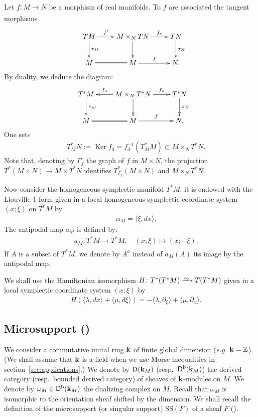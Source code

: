 \documentclass[12pt,leqno]{article}
\theoremstyle{definition}
\newcommand{\Z}{{\mathbb{Z}}}
\newcommand{\cor}{{\bf k}}
\renewcommand{\ker}{\operatorname{Ker}}
\renewcommand{\to}[1][]{\xrightarrow[]{#1}}
\newcommand{\isoto}[1][]{\xrightarrow[#1]%
{{\raisebox{-.6ex}[0ex][-.6ex]{$\mspace{1mu}\sim\mspace{2mu}$}}}}
\newcommand{\opb}[1]{#1^{-1}}
\newcommand{\eqdot}{\mathbin{:=}}
\newcommand{\cl}{\colon}
\newcommand{\ba}{\begin{array}}
\newcommand{\ea}{\end{array}}
\newcommand{\eq}{\begin{eqnarray}}
\newcommand{\eneq}{\end{eqnarray}}
\newcommand{\eqn}{\begin{eqnarray*}}
\newcommand{\eneqn}{\end{eqnarray*}}
\newcommand{\Der}[1][]{\mathsf{D}^{#1}}
\newcommand{\Derb}{\Der[\mathrm{b}]}
\newcommand{\SSi}{\mathrm{SS}}
\numberwithin{equation}{section}
\begin{document}
Let $f\cl M\to N$ be  a morphism of  real manifolds. 
To $f$ are associated the tangent morphisms
\eq\label{diag:tgmor}
&&
\ba{c}
\xymatrix{
TM\ar[d]^-{\tau_M}\ar[r]^-{f'}&M\times_NTN\ar[d]\ar[r]^-{f_\tau}&TN\ar[d]^-{\tau_N}\\
M\ar@{=}[r]&M\ar[r]^-f&N.
}\ea\eneq
By duality, we deduce the diagram: 
\eq\label{diag:cotgmor}
&&\ba{c}\xymatrix{
T^*M\ar[d]^-{\pi_M}&M\times_NT^*N\ar[d]\ar[l]_-{f_d}\ar[r]^-{f_\pi}
                                       & T^*N\ar[d]^-{\pi_N}\\
M\ar@{=}[r]&M\ar[r]^-f&N.
}\ea\eneq
One sets 
\eqn
&&T^*_MN\eqdot\ker f_d= \opb{f_d}(T^*_MM)\subset M\times_NT^*N  . 
\eneqn
Note that, denoting by $\Gamma_f$ the graph of $f$ in $M\times N$, 
the projection $T^*(M\times N)\to M\times T^*N$ identifies 
$T^*_{\Gamma_f}(M\times N)$ and $M\times_NT^*N$.




Now consider the homogeneous symplectic manifold $T^*M$: it is endowed
with the Liouville $1$-form given in a local homogeneous symplectic 
coordinate system $(x;\xi)$ on $T^*M$ by
\eqn
&&\alpha_M=\langle\xi,dx\rangle.
\eneqn
The antipodal map $a_M$ is defined by:
\eq\label{eq:antipodal}
&&a_M\cl T^*M\to T^*M,\quad(x;\xi)\mapsto(x;-\xi).
\eneq
If $A$ is a subset of $T^*M$, we denote by $A^a$ instead of $a_M(A)$ 
its image by the antipodal map.

We shall use the Hamiltonian isomorphism 
$H\cl T^*(T^*M)\isoto T(T^*M)$ given in a local symplectic coordinate system 
$(x;\xi)$ by
\eqn
&&H(\langle\lambda,dx\rangle +\langle \mu,d\xi\rangle)
=-\langle\lambda,\partial_\xi\rangle +\langle \mu,\partial_x\rangle.
\eneqn




\subsection{Microsupport (\cite[\S 5.1,~\S 6.5]{KS90})}
We consider a commutative unital ring $\cor$ of finite global dimension 
({\em e.g.} $\cor=\Z$).
(We shall assume that $\cor$ is a field
when we use Morse inequalities in section~\ref{sec:applications}.)
We denote by $\Der(\cor_M)$ (resp.\ $\Derb(\cor_M)$) 
the derived category (resp.\  bounded derived category) of sheaves
of $\cor$-modules on $M$. 
We denote by $\omega_M\in\Derb(\cor_M)$ the dualizing complex on $M$.
Recall that $\omega_M$ is isomorphic to the orientation sheaf shifted by the
dimension. 
We shall recall the definition 
of the microsupport (or singular support) $\SSi(F)$ of a sheaf $F$
(\cite[Def.~5.1.2]{KS90}).
\end{document}
